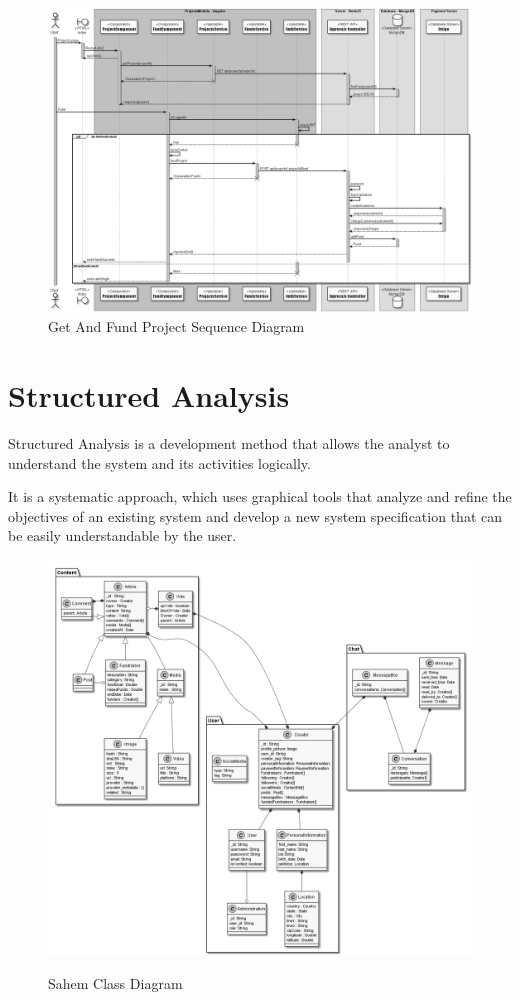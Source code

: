 \begin{figure}[!ht]
      \center
      \includegraphics[scale=0.37,angle=90]{assets/project.png}
      \caption{Get And Fund Project Sequence Diagram}
      \label{fig:project seq}

\end{figure}
\clearpage
\section{Structured Analysis}
Structured Analysis is a development method that allows the analyst to understand the system and its activities logically.

It is a systematic approach, which uses graphical tools that analyze and refine the objectives of an existing system and develop a new system specification that can be easily understandable by the user.


\begin{figure}[!ht]
      \center
      \includegraphics[scale=0.40,angle=90]{assets/User.png}
      \label{fig:qweq}
      \caption{Sahem Class Diagram}
\end{figure}


